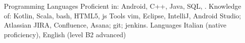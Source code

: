 \begin{cvskills}
  \cvskill
    {Programming Languages}
    {Proficient in: Android, C++, Java, SQL, \LaTeXe{}. 
       Knowledge of:
       Kotlin, Scala, bash, HTML5, js}
  \cvskill
  {Tools}
  {vim, Eclipse, IntelliJ, Android Studio;
   Atlassian JIRA, Confluence,
   Asana;
   git;
   jenkins.
  }
  \cvskill
    {Languages}
    {Italian (native proficiency), English 
   (level B2 advanced)}


\end{cvskills}
